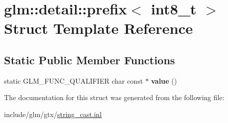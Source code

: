 \hypertarget{structglm_1_1detail_1_1prefix_3_01int8__t_01_4}{}\section{glm\+:\+:detail\+:\+:prefix$<$ int8\+\_\+t $>$ Struct Template Reference}
\label{structglm_1_1detail_1_1prefix_3_01int8__t_01_4}
\subsection*{Static Public Member Functions}
\begin{DoxyCompactItemize}
\item 
\mbox{\label{structglm_1_1detail_1_1prefix_3_01int8__t_01_4_afb4b2223c44e4e8f75bde375b0f874a2}} 
static G\+L\+M\+\_\+\+F\+U\+N\+C\+\_\+\+Q\+U\+A\+L\+I\+F\+I\+ER char const  $\ast$ {\bfseries value} ()
\end{DoxyCompactItemize}


The documentation for this struct was generated from the following file\+:\begin{DoxyCompactItemize}
\item 
include/glm/gtx/\hyperlink{string__cast_8inl}{string\+\_\+cast.\+inl}\end{DoxyCompactItemize}

